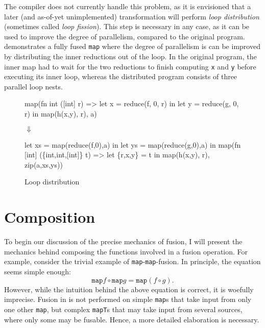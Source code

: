\begin{description}[style=nextline]
  The \LO{} compiler does not currently handle this problem, as it is
  envisioned that a later (and as-of-yet unimplemented) transformation
  will perform \textit{loop distribution} (sometimes called
  \textit{loop fission}).  This step is necessary in any case, as it
  can be used to improve the degree of parallelism, compared to the
  original program.   demonstrates a fully
  fused \texttt{map} where the degree of parallelism is can be
  improved by distributing the inner reductions out of the loop.  In
  the original program, the inner map had to wait for the two
  reductions to finish computing \texttt{x} and \texttt{y} before
  executing its inner loop, whereas the distributed program consists
  of three parallel loop nests.
\end{description}

\begin{figure}
\begin{center}
\begin{bcolorcode}
map(fn int ([int] r) =>
      let x = reduce(f, 0, r) in
      let y = reduce(g, 0, r) in
      map(h(x,y), r),
    a)
\end{bcolorcode}

$\Downarrow$

\begin{bcolorcode}
let xs = map(reduce(f,0),a) in
let ys = map(reduce(g,0),a) in
map(fn [int] (\{int,int,[int]\} t) =>
      let \{r,x,y\} = t in
      map(h(x,y), r),
    zip(a,xs,ys))
\end{bcolorcode}
\end{center}
\caption{Loop distribution}
\label{fig:loop-distribution}
\end{figure}

\section{Composition}

\newcommand\mapcompose[7]{ (#1,#2) \underset{\texttt{map}}{\overset{#3}\circ}(#4,#5) \Rightarrow (#6,#7) }
\newcommand\filtercompose[7]{ (#1,#2) \underset{\texttt{filter}}{\overset{#3}\circ}(#4,#5) \Rightarrow (#6,#7) }
\newcommand\foldcompose[7]{ (#1,#2) \underset{\texttt{fold}}{\overset{#3}\circ}(#4,#5) \Rightarrow (#6,#7) }
\newcommand\inputmapping[0]{\mathcal{I}}
\newcommand\arrparams[1]{\textrm{params}(#1)}

To begin our discussion of the precise mechanics of fusion, I will
present the mechanics behind composing the functions involved in a
fusion operation.  For example, consider the trivial example of
\texttt{map}-\texttt{map}-fusion.  In principle, the equation seems
simple enough:
\[
\texttt{map} f \circ \texttt{map} g = \texttt{map} (f \circ g).
\]
However, while the intuition behind the above equation is correct, it
is woefully imprecise.  Fusion in \LO{} is not performed on simple
\texttt{map}s that take input from only one other \texttt{map}, but
complex \texttt{mapT}s that may take input from several sources, where
only some may be fusable.  Hence, a more detailed elaboration is
necessary.

